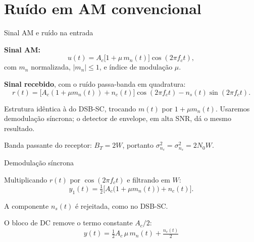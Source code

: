 
\section{Ruído em AM convencional}

\begin{frame}{Sinal AM e ruído na entrada}

\textbf{Sinal AM:}
\[
u(t) = A_c\bigl[1 + \mu\, m_n(t)\bigr]\cos(2\pi f_c t),
\]
com $m_n$ normalizada, $|m_n| \le 1$, e índice de modulação $\mu$.

\vspace{0.2cm}

\textbf{Sinal recebido}, com o ruído passa-banda em quadratura:
\[
r(t) = \bigl[A_c(1 + \mu m_n(t)) + n_c(t)\bigr]\cos(2\pi f_c t) - n_s(t)\sin(2\pi f_c t).
\]

\vspace{0.2cm}

Estrutura idêntica à do DSB-SC, trocando $m(t)$ por $1 + \mu m_n(t)$. Usaremos demodulação síncrona; o detector de envelope, em alta SNR, dá o mesmo resultado.

\vspace{0.2cm}

Banda passante do receptor: $B_T = 2W$, portanto $\sigma^2_{n_c} = \sigma^2_{n_s} = 2 N_0 W$.

\end{frame}


\begin{frame}{Demodulação síncrona}

Multiplicando $r(t)$ por $\cos(2\pi f_c t)$ e filtrando em $W$:
\[
y_1(t) = \tfrac{1}{2}\bigl[A_c\bigl(1 + \mu m_n(t)\bigr) + n_c(t)\bigr].
\]

A componente $n_s(t)$ é rejeitada, como no DSB-SC.

\vspace{0.2cm}

O bloco de DC remove o termo constante $A_c/2$:
\[
\boxed{y(t) = \tfrac{1}{2} A_c\, \mu\, m_n(t) + \tfrac{n_c(t)}{2}}
\]

\end{frame}


